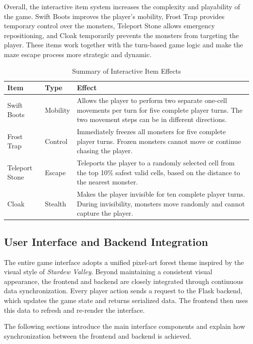Overall, the interactive item system increases the complexity and playability of the game. Swift Boots improves the player’s mobility, Frost Trap provides temporary control over the monsters, Teleport Stone allows emergency repositioning, and Cloak temporarily prevents the monsters from targeting the player. These items work together with the turn-based game logic and make the maze escape process more strategic and dynamic.

\begin{table}[H]
\centering
\caption{Summary of Interactive Item Effects}
\label{tab:item_effects}
\renewcommand{\arraystretch}{1.25}
\begin{tabular}{p{3cm} p{3cm} p{8cm}}
\toprule
\textbf{Item} & \textbf{Type} & \textbf{Effect} \\
\midrule
Swift Boots & Mobility & Allows the player to perform two separate one-cell movements per turn for five complete player turns. The two movement steps can be in different directions. \\
Frost Trap & Control & Immediately freezes all monsters for five complete player turns. Frozen monsters cannot move or continue chasing the player. \\
Teleport Stone & Escape & Teleports the player to a randomly selected cell from the top 10\% safest valid cells, based on the distance to the nearest monster. \\
Cloak & Stealth & Makes the player invisible for ten complete player turns. During invisibility, monsters move randomly and cannot capture the player. \\
\bottomrule
\end{tabular}
\end{table}

\subsection{User Interface and Backend Integration}

The entire game interface adopts a unified pixel-art forest theme inspired by the visual style of \textit{Stardew Valley}. Beyond maintaining a consistent visual appearance, the frontend and backend are closely integrated through continuous data synchronization. Every player action sends a request to the Flask backend, which updates the game state and returns serialized data. The frontend then uses this data to refresh and re-render the interface.

The following sections introduce the main interface components and explain how synchronization between the frontend and backend is achieved.

